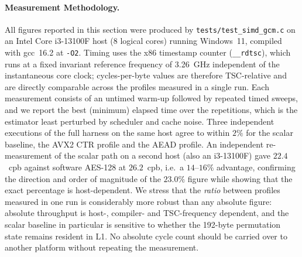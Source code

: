\documentclass[review,12pt]{elsarticle}
\begin{document}
\paragraph{Measurement Methodology.}
All figures reported in this section were produced by \texttt{tests/test\_simd\_gcm.c} on an Intel Core i3-13100F host (8 logical cores) running Windows~11, compiled with gcc~16.2 at \texttt{-O2}. Timing uses the x86 timestamp counter (\texttt{\_\_rdtsc}), which runs at a fixed invariant reference frequency of 3.26~GHz independent of the instantaneous core clock; cycles-per-byte values are therefore TSC-relative and are directly comparable across the profiles measured in a single run. Each measurement consists of an untimed warm-up followed by repeated timed sweeps, and we report the best (minimum) elapsed time over the repetitions, which is the estimator least perturbed by scheduler and cache noise. Three independent executions of the full harness on the same host agree to within $2\%$ for the scalar baseline, the AVX2 CTR profile and the AEAD profile. An independent re-measurement of the scalar path on a second host (also an i3-13100F) gave $22.4$~cpb against software AES-128 at $26.2$~cpb, i.e.\ a $14$--$16\%$ advantage, confirming the direction and order of magnitude of the $23.0\%$ figure while showing that the exact percentage is host-dependent. We stress that the \emph{ratio} between profiles measured in one run is considerably more robust than any absolute figure: absolute throughput is host-, compiler- and TSC-frequency dependent, and the scalar baseline in particular is sensitive to whether the 192-byte permutation state remains resident in L1. No absolute cycle count should be carried over to another platform without repeating the measurement.

\begin{table}[htbp]
\caption{Benchmark evaluation of Tesseract-128 execution profiles and Tesseract-GCM on a 5~MB payload (50 iterations, non-AES-NI software baseline on Intel Core x86-64).}
\label{tab:simd_gcm_benchmark}
\centering
\small
{}
\end{table}
\end{document}
